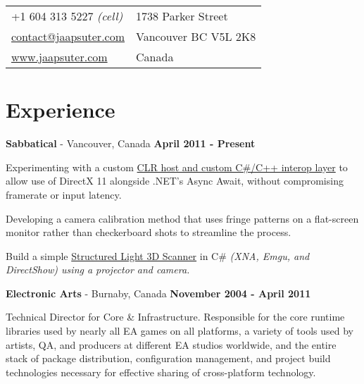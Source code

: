 \documentclass[margin, line]{resume}
\begin{document}

\begin{resume}

\vspace{.05in}
\begin{tabular}{@{}p{2in}p{4in}}
+1 604 313 5227 \it{(cell)} 					          & 1738 Parker Street         		\\
\href{mailto:contact@jaapsuter.com }{contact@jaapsuter.com} & Vancouver BC \hspace{1mm}V5L 2K8  \\
\href{http://www.jaapsuter.com}{www.jaapsuter.com}     	 & Canada                            \\
\end{tabular}

\section{\sc Experience}

{\bf Sabbatical} - Vancouver, Canada \hfill {\bf April 2011 - Present}
\\
\begin{list3}
	\item Experimenting with a custom \href{https://github.com/JaapSuter/Ten18#readme}{CLR host and custom C\#/C++ interop layer} to allow use of DirectX 11 alongside .NET's Async Await, without compromising
		 framerate or input latency.
	\item Developing a camera calibration method that uses fringe patterns on a flat-screen monitor rather than checkerboard shots to streamline the process.
	\item Build a simple \href{https://github.com/JaapSuter/Pentacorn#readme}{Structured Light 3D Scanner} in C\# \it{(XNA, Emgu, and DirectShow)} using a projector and camera.	
\end{list3}

{\bf Electronic Arts} - Burnaby, Canada \hfill {\bf November 2004 - April 2011}

Technical Director for Core \& Infrastructure. Responsible for the core runtime libraries used by nearly all EA games on all platforms, a variety of tools used by artists, QA, and producers at different EA studios worldwide, and the entire stack of package distribution, configuration management, and project build technologies necessary for effective sharing of cross-platform technology.


\end{resume}
\end{document}
